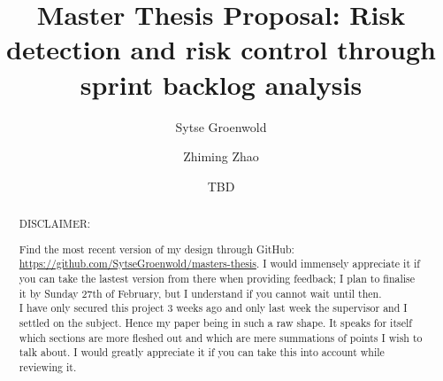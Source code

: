 \documentclass[sigconf]{acmart}
\begin{document}
\title{Master Thesis Proposal: Risk detection and risk control through sprint backlog analysis}

\author{Sytse Groenwold}

\author{Zhiming Zhao}

\author{TBD}

\renewcommand{\shortauthors}{Groenwold, S.}

\begin{abstract}

DISCLAIMER: 

Find the most recent version of my design through GitHub: \url{https://github.com/SytseGroenwold/masters-thesis}. I would immensely appreciate it if you can take the lastest version from there when providing feedback; I plan to finalise it by Sunday 27th of February, but I understand if you cannot wait until then. \\

I have only secured this project 3 weeks ago and only last week the supervisor and I settled on the subject. Hence my paper being in such a raw shape. It speaks for itself which sections are more fleshed out and which are mere summations of points I wish to talk about. I would greatly appreciate it if you can take this into account while reviewing it.
\end{abstract}


\maketitle
\end{document}
